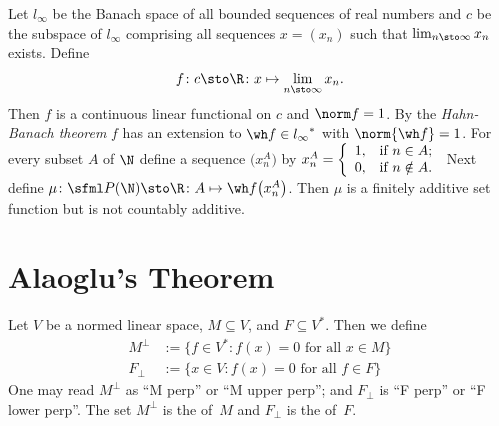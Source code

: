 \begin{exam}\label{C067181} Let $l_\infty$ be the Banach space of all bounded sequences of
real numbers and $c$ be the subspace of $l_\infty$ comprising all sequences $x = (x_n)$
such that $\lim_{n \sto \infty} x_n$ exists. Define
  \[ f\colon c \sto \R\colon x \mapsto \lim_{n\sto \infty} x_n. \]
Then $f$ is a continuous linear functional on $c$ and $\norm f = 1$.  By the
\emph{Hahn-Banach theorem} $f$ has an extension to $\wh f \in {l_\infty}^*$ with
$\norm{\wh f} = 1$. For every
subset $A$ of $\N$ define a sequence $\bigl(x^A_n\bigr)$ by $x^A_n = \left\{%
\begin{array}{ll}
    1, & \hbox{if $n \in A$;} \\
    0, & \hbox{if $n \notin A$.} \\
\end{array}%
\right.$ Next define $ \mu\colon \sfml P(\N) \sto \R \colon A \mapsto \wh
f\bigl(x^A_n\bigr)$. Then $\mu$ is a finitely additive set function but is not countably
additive.
\end{exam}












\section{Alaoglu's Theorem}
\begin{notn} Let $V$ be a normed linear space, $M \subseteq V$, and $F \subseteq V^\ast$.
Then we define
 \begin{align*}
         M^\perp &:= \{f \in V^*\colon f(x)=0 \text{ for all $x \in M$}\} \\
         F_\perp &:= \{x \in V\colon f(x)=0 \text{ for all $f \in F$}\}
  \end{align*}
One may read $M^\perp$ as ``M perp'' or ``M upper perp''; and $F_\perp$ is ``F perp'' or ``F lower perp''.
The set $M^\perp$ is the
 of~$M$ and $F_\perp$ is the
 of~$F$.
\end{notn}

